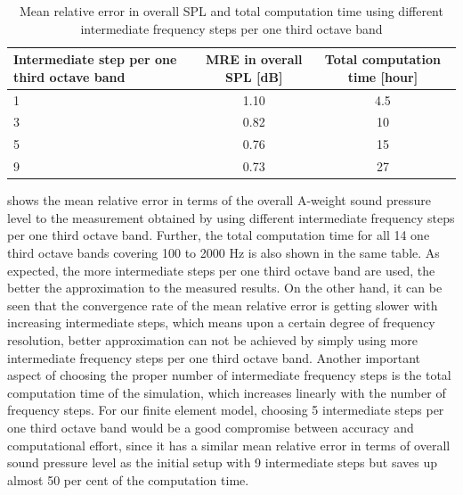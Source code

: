 \begin{table}[H]
	\caption{Mean relative error in overall SPL and total computation time using different intermediate frequency steps per one third octave band}
	\label{tab:freq_steps_MRE}
	\begin{tabularx}{\columnwidth}{|X|c|c|}
	\hline
	\textbf{Intermediate step per one third octave band} & \textbf{MRE in overall SPL {[}dB{]}} & \textbf{Total computation time {[}hour{]}} \\ \hline
	\hspace{65pt} 1                                                    & 1.10                                 & 4.5                                        \\ \hline
	\hspace{65pt} 3                                                    & 0.82                                 & 10                                         \\ \hline
	\hspace{65pt} 5                                                    & 0.76                                 & 15                                         \\ \hline
	\hspace{65pt} 9                                                    & 0.73                                 & 27                                         \\ \hline
	\end{tabularx}
\end{table}

\noindent{} shows the mean relative error in terms of the overall A-weight sound pressure level to the measurement obtained by using different intermediate frequency steps per one third octave band. Further, the total computation time for all 14 one third octave bands covering 100 to 2000 Hz is also shown in the same table. As expected, the more intermediate steps per one third octave band are used, the better the approximation to the measured results. On the other hand, it can be seen that the convergence rate of the mean relative error is getting slower with increasing intermediate steps, which means upon a certain degree of frequency resolution, better approximation can not be achieved by simply using more intermediate frequency steps per one third octave band. Another important aspect of choosing the proper number of intermediate frequency steps is the total computation time of the simulation, which increases linearly with the number of frequency steps. For our finite element model, choosing 5 intermediate steps per one third octave band would be a good compromise between accuracy and computational effort, since it has a similar mean relative error in terms of overall sound pressure level as the initial setup with 9 intermediate steps but saves up almost 50 per cent of the computation time.

